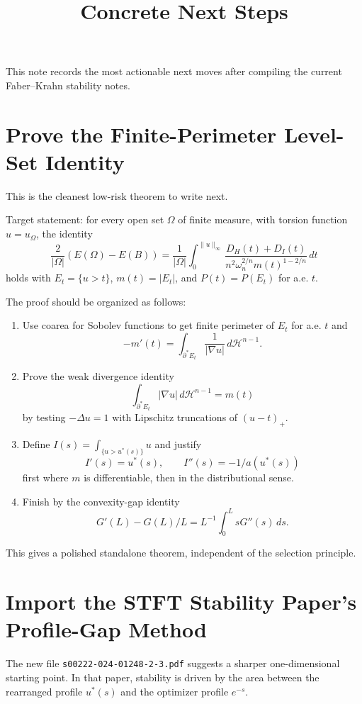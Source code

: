 \documentclass[11pt]{article}
\title{Concrete Next Steps}
\author{}
\date{}
\begin{document}
\maketitle

This note records the most actionable next moves after compiling the current
Faber--Krahn stability notes.

\section{Prove the Finite-Perimeter Level-Set Identity}

This is the cleanest low-risk theorem to write next.

Target statement: for every open set \(\Omega\) of finite measure, with torsion
function \(u=u_\Omega\), the identity
\[
\frac{2}{|\Omega|}(E(\Omega)-E(B))
=
\frac1{|\Omega|}
\int_0^{\|u\|_\infty}
\frac{D_H(t)+D_I(t)}
{n^2\omega_n^{2/n}m(t)^{1-2/n}}\,dt
\]
holds with \(E_t=\{u>t\}\), \(m(t)=|E_t|\), and \(P(t)=P(E_t)\) for a.e. \(t\).

The proof should be organized as follows:
\begin{enumerate}
\item Use coarea for Sobolev functions to get finite perimeter of \(E_t\) for
a.e. \(t\) and
\[
-m'(t)=\int_{\partial^*E_t}\frac1{|\nabla u|}\,d\mathcal H^{n-1}.
\]
\item Prove the weak divergence identity
\[
\int_{\partial^*E_t}|\nabla u|\,d\mathcal H^{n-1}=m(t)
\]
by testing \(-\Delta u=1\) with Lipschitz truncations of \((u-t)_+\).
\item Define \(I(s)=\int_{\{u>u^*(s)\}}u\) and justify
\[
I'(s)=u^*(s),\qquad I''(s)=-1/a(u^*(s))
\]
first where \(m\) is differentiable, then in the distributional sense.
\item Finish by the convexity-gap identity
\[
G'(L)-G(L)/L=L^{-1}\int_0^L sG''(s)\,ds.
\]
\end{enumerate}
This gives a polished standalone theorem, independent of the selection
principle.

\section{Import the STFT Stability Paper's Profile-Gap Method}

The new file \texttt{s00222-024-01248-2-3.pdf} suggests a sharper
one-dimensional starting point. In that paper, stability is driven by the area
between the rearranged profile \(u^*(s)\) and the optimizer profile \(e^{-s}\).
\end{document}
